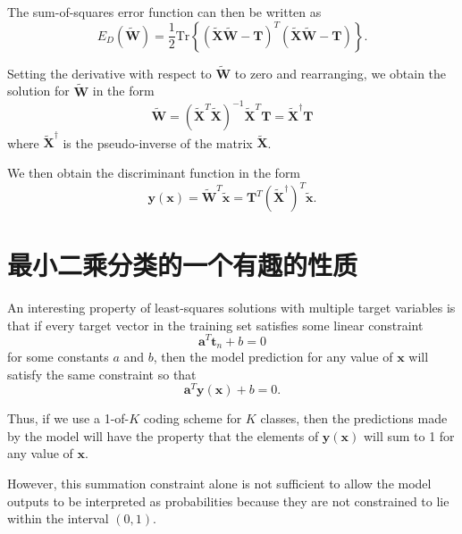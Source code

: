 \documentclass{article}
\begin{document}
The sum-of-squares error function can then be written as
\begin{equation}
E_D(\widetilde{\mathbf{W}}) = \frac{1}{2} \text{Tr}\left\{ (\widetilde{\mathbf{X}}\widetilde{\mathbf{W}} - \mathbf{T})^T (\widetilde{\mathbf{X}}\widetilde{\mathbf{W}} - \mathbf{T}) \right\}.
\tag{5.14}
\end{equation}

Setting the derivative with respect to $\widetilde{\mathbf{W}}$ to zero and rearranging, we obtain the solution for $\widetilde{\mathbf{W}}$ in the form
\begin{equation}
\widetilde{\mathbf{W}} = (\widetilde{\mathbf{X}}^T \widetilde{\mathbf{X}})^{-1} \widetilde{\mathbf{X}}^T \mathbf{T} = \widetilde{\mathbf{X}}^\dagger \mathbf{T}
\tag{5.15}
\end{equation}
where $\widetilde{\mathbf{X}}^\dagger$ is the pseudo-inverse of the matrix $\widetilde{\mathbf{X}}$. 

We then obtain the discriminant function in the form
\begin{equation}
\mathbf{y}(\mathbf{x}) = \widetilde{\mathbf{W}}^T \widetilde{\mathbf{x}} = \mathbf{T}^T \left( \widetilde{\mathbf{X}}^\dagger \right)^T \widetilde{\mathbf{x}}.
\tag{5.16}
\end{equation}


\section{最小二乘分类的一个有趣的性质}

An interesting property of least-squares solutions with multiple target variables is that if every target vector in the training set satisfies some linear constraint
\begin{equation}
\mathbf{a}^T \mathbf{t}_n + b = 0
\tag{5.17}
\end{equation}
for some constants $a$ and $b$, then the model prediction for any value of $\mathbf{x}$ will satisfy the same constraint so that
\begin{equation}
\mathbf{a}^T \mathbf{y}(\mathbf{x}) + b = 0.
\tag{5.18}
\end{equation}

Thus, if we use a 1-of-$K$ coding scheme for $K$ classes, then the predictions made by the model will have the property that the elements of $\mathbf{y}(\mathbf{x})$ will sum to 1 for any value of $\mathbf{x}$. 

However, this summation constraint alone is not sufficient to allow the model outputs to be interpreted as probabilities because they are not constrained to lie within the interval $(0,1)$.
\end{document}
